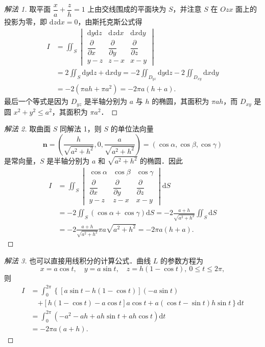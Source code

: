 \begin{proof}[解法 1]
取平面 $\dfrac{x}{a}+\dfrac{z}{h}=1$ 上由交线围成的平面块为 $S$，并注意 $S$ 在 $Ozx$ 面上的投影为零，即 $\mathrm{d}z\mathrm{d}x=0$，由斯托克斯公式得
\[
\begin{aligned}
I&=\iint_{S}\begin{vmatrix}\mathrm{d}y\mathrm{d}z&\mathrm{d}z\mathrm{d}x&\mathrm{d}x\mathrm{d}y\\[3pt]\dfrac{\partial}{\partial x}&\dfrac{\partial}{\partial y}&\dfrac{\partial}{\partial z}\\[3pt] y-z&z-x&x-y\end{vmatrix}\\
&=2\iint_{S}\mathrm{d}y\mathrm{d}z+\mathrm{d}x\mathrm{d}y=-2\iint_{D_{yz}}\mathrm{d}y\mathrm{d}z-2\iint_{D_{xy}}\mathrm{d}x\mathrm{d}y\\
&=-2(\pi ah+\pi a^{2})=-2\pi a(h+a).
\end{aligned}
\]
最后一个等式是因为 $D_{yz}$ 是半轴分别为 $a$ 与 $h$ 的椭圆，其面积为 $\pi ah$，而 $D_{xy}$ 是圆 $x^{2}+y^{2}\leqslant a^{2}$，其面积为 $\pi a^{2}$．
\end{proof}

\begin{proof}[解法 2]
取曲面 $S$ 同解法 1，则 $S$ 的单位法向量
\[
\bm{n}=\left(\frac{h}{\sqrt{a^{2}+h^{2}}},0,\frac{a}{\sqrt{a^{2}+h^{2}}}\right)=(\cos\alpha,\cos\beta,\cos\gamma)
\]
是常向量，$S$ 是半轴分别为 $a$ 和 $\sqrt{a^{2}+h^{2}}$ 的椭圆．因此
\[
\begin{aligned}
I&=\iint_{S}\begin{vmatrix}\cos\alpha&\cos\beta&\cos\gamma\\[3pt]\dfrac{\partial}{\partial x}&\dfrac{\partial}{\partial y}&\dfrac{\partial}{\partial z}\\[3pt] y-z&z-x&x-y\end{vmatrix}\mathrm{d}S\\
&=-2\iint_{S}(\cos\alpha+\cos\gamma)\mathrm{d}S=-2\frac{a+h}{\sqrt{a^{2}+h^{2}}}\iint_{S}\mathrm{d}S\\
&=-2\frac{a+h}{\sqrt{a^{2}+h^{2}}}\pi a\sqrt{a^{2}+h^{2}}=-2\pi a(h+a).
\end{aligned}
\]
\end{proof}

\begin{proof}[解法 3]
也可以直接用线积分的计算公式．曲线 $L$ 的参数方程为
\[
x=a\cos t,\quad y=a\sin t,\quad z=h(1-\cos t),\ 0\leqslant t\leqslant 2\pi,
\]
则
\[
\begin{aligned}
I&=\int_{0}^{2\pi}\left\{\left[a\sin t-h(1-\cos t)\right](-a\sin t)\right.\\
&\quad\left.+\left[h(1-\cos t)-a\cos t\right]a\cos t+a(\cos t-\sin t)h\sin t\right\}\mathrm{d}t\\
&=\int_{0}^{2\pi}\left(-a^{2}-ah+ah\sin t+ah\cos t\right)\mathrm{d}t\\
&=-2\pi a(a+h).
\end{aligned}
\]
\end{proof}

